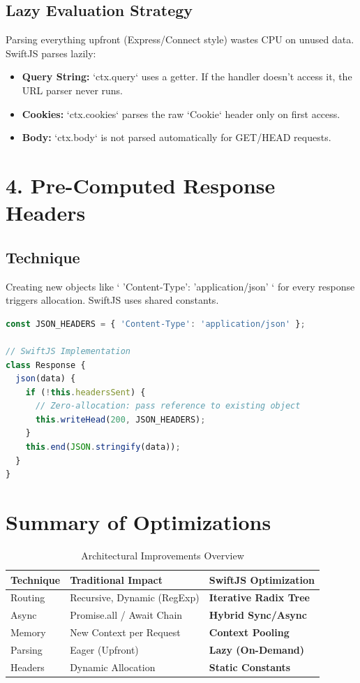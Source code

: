 \documentclass[11pt, a4paper]{article}
\begin{document}
\subsection{Lazy Evaluation Strategy}
Parsing everything upfront (Express/Connect style) wastes CPU on unused data. SwiftJS parses lazily:

\begin{itemize}
    \item \textbf{Query String:} `ctx.query` uses a getter. If the handler doesn't access it, the URL parser never runs.
    \item \textbf{Cookies:} `ctx.cookies` parses the raw `Cookie` header only on first access.
    \item \textbf{Body:} `ctx.body` is not parsed automatically for GET/HEAD requests.
\end{itemize}

\section{4. Pre-Computed Response Headers}

\subsection{Technique}
Creating new objects like `{ 'Content-Type': 'application/json' }` for every response triggers allocation. SwiftJS uses shared constants.

\begin{lstlisting}[language=TypeScript]
const JSON_HEADERS = { 'Content-Type': 'application/json' };

// SwiftJS Implementation
class Response {
  json(data) {
    if (!this.headersSent) {
      // Zero-allocation: pass reference to existing object
      this.writeHead(200, JSON_HEADERS); 
    }
    this.end(JSON.stringify(data));
  }
}
\end{lstlisting}

\section{Summary of Optimizations}

\begin{table}[h]
\centering
\begin{tabular}{@{} l l l @{}}
\toprule
\textbf{Technique} & \textbf{Traditional Impact} & \textbf{SwiftJS Optimization} \\
\midrule
Routing & Recursive, Dynamic (RegExp) & \textbf{Iterative Radix Tree} \\
Async & Promise.all / Await Chain & \textbf{Hybrid Sync/Async} \\
Memory & New Context per Request & \textbf{Context Pooling} \\
Parsing & Eager (Upfront) & \textbf{Lazy (On-Demand)} \\
Headers & Dynamic Allocation & \textbf{Static Constants} \\
\bottomrule
\end{tabular}
\caption{Architectural Improvements Overview}
\end{table}
\end{document}
